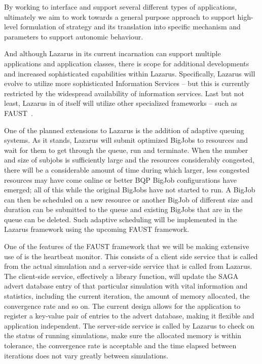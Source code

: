 \documentclass{sig-alternate}
\begin{document}
By working to interface and support several different types of
applications, ultimately we aim to work towards a general purpose
approach to support high-level formulation of strategy and its
translation into specific mechanism and parameters to support
autonomic behaviour.

And although Lazarus in its current incarnation can support multiple
applications and application classes, there is scope for additional
developments and increased sophisticated capabilities within Lazarus.
Specifically, Lazarus will evolve to utilize more sophisticated
Information Services -- but this is currently restricted by the
widespread availability of information services. Last but not least,
Lazarus in of itself will utilize other specialized frameworks -- such
as FAUST~\cite{faust_url}.

One of the planned extensions to Lazarus is the addition of adaptive
queuing systems. As it stands, Lazarus will submit optimized BigJobs
to resources and wait for them to get through the queue, run and
terminate.  When the number and size of subjobs is sufficiently large
and the resources considerably congested, there will be a considerable
amount of time during which larger, less congested resources may have
come online or better BQP BigJob configurations have emerged; all of
this while the original BigJobs have not started to run. A BigJob can
then be scheduled on a new resource or another BigJob of different
size and duration can be submitted to the queue and existing BigJobs
that are in the queue can be deleted.  Such adaptive scheduling will
be implemented in the Lazarus framework using the upcoming FAUST
framework.

One of the features of the FAUST framework that we will be making extensive
use of is the heartbeat monitor. This consists of a client side service
that is called from the actual simulation and a server-side service that is called
from Lazarus. The client-side service, effectively a library function,
will update the SAGA advert database entry of that particular simulation
with vital information and statistics, including the current iteration,
the amount of memory allocated, the convergence rate and so on. The current
design allows for the application to register a key-value pair of entries
to the advert database, making it flexible and application independent. The
server-side service is called by Lazarus to check on the status of running
simulations, make sure the allocated memory is within tolerance, the convergence
rate is acceptable and the time elapsed between iterations does not vary greatly between
simulations.
\end{document}
